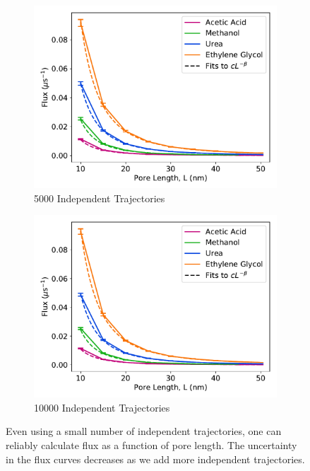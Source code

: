\documentclass{article}
\begin{document}
\begin{figure}
\begin{subfigure}{0.45\textwidth}
  \includegraphics[width=\textwidth]{flux_curves_N5000.pdf}
  \caption{5000 Independent Trajectories}\label{fig:N5000}
  \end{subfigure}
  \begin{subfigure}{0.45\textwidth}
  \includegraphics[width=\textwidth]{flux_curves_N9984.pdf}
  \caption{10000 Independent Trajectories}\label{fig:N10000}
  \end{subfigure}
  \caption{Even using a small number of independent trajectories, one can
  reliably calculate flux as a function of pore length. The uncertainty in
  the flux curves decreases as we add more independent trajectories.}\label{fig:flux_curve_sensitivity}
  \end{figure}
\end{document}
